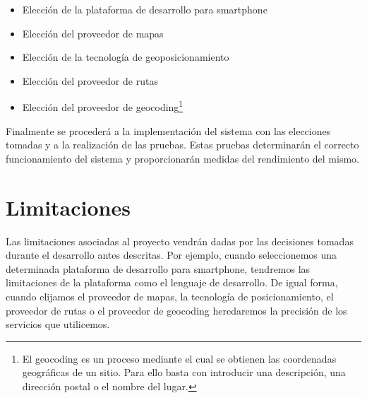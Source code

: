 \begin{itemize}
  \item Elección de la plataforma de desarrollo para smartphone
  \item Elección del proveedor de mapas
  \item Elección de la tecnología de geoposicionamiento
  \item Elección del proveedor de rutas
  \item Elección del proveedor de geocoding\footnote{El geocoding es un proceso mediante el cual se
    obtienen las coordenadas geográficas de un sitio. Para ello basta con introducir una
    descripción, una dirección postal o el nombre del lugar.}
\end{itemize}

Finalmente se procederá a la implementación del sistema con las elecciones tomadas y a la
realización de las pruebas. Estas pruebas determinarán el correcto funcionamiento del sistema y
proporcionarán medidas del rendimiento del mismo.

\section{Limitaciones}

Las limitaciones asociadas al proyecto vendrán dadas por las decisiones tomadas durante el
desarrollo antes descritas. Por ejemplo, cuando seleccionemos una determinada plataforma de
desarrollo para smartphone, tendremos las limitaciones de la plataforma como el lenguaje de
desarrollo. De igual forma, cuando elijamos el proveedor de mapas, la tecnología de posicionamiento,
el proveedor de rutas o el proveedor de geocoding heredaremos la precisión de los servicios que
utilicemos.

